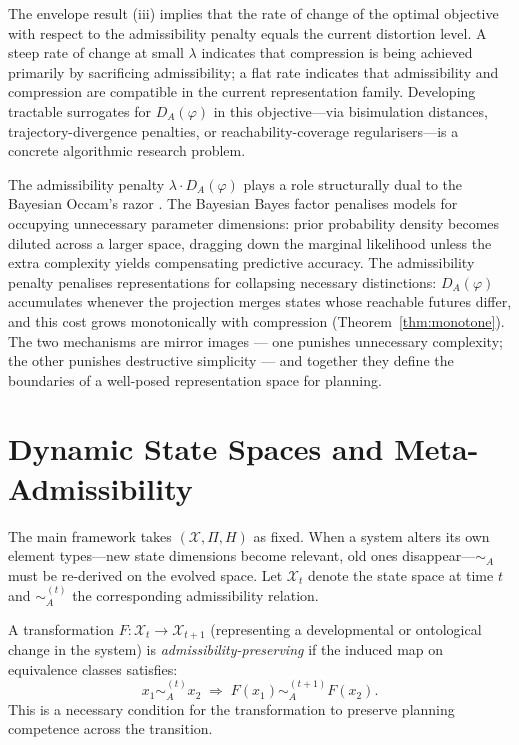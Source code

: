 \documentclass[10pt,twocolumn]{article}
\theoremstyle{plain}
\theoremstyle{definition}
\theoremstyle{remark}
\newcommand{\simA}{\sim_{\!A}}
\newcommand{\DA}{D_{A}(\varphi)}
\newcommand{\calX}{\mathcal{X}}
\begin{document}
The envelope result (iii) implies that the rate of change of the optimal
objective with respect to the admissibility penalty equals the current distortion
level. A steep rate of change at small $\lambda$ indicates that compression is
being achieved primarily by sacrificing admissibility; a flat rate indicates that
admissibility and compression are compatible in the current representation family.
Developing tractable surrogates for $\DA$ in this objective---via bisimulation
distances, trajectory-divergence penalties, or reachability-coverage
regularisers---is a concrete algorithmic research problem.

The admissibility penalty $\lambda\cdot\DA$ plays a role structurally dual to
the Bayesian Occam's razor \citep{jaynes2003probability}. The Bayesian Bayes
factor penalises models for occupying unnecessary parameter dimensions: prior
probability density becomes diluted across a larger space, dragging down the
marginal likelihood unless the extra complexity yields compensating predictive
accuracy. The admissibility penalty penalises representations for collapsing
necessary distinctions: $\DA$ accumulates whenever the projection merges states
whose reachable futures differ, and this cost grows monotonically with compression
(Theorem~\ref{thm:monotone}). The two mechanisms are mirror images --- one
punishes unnecessary complexity; the other punishes destructive simplicity --- and
together they define the boundaries of a well-posed representation space for
planning.

\section{Dynamic State Spaces and Meta-Admissibility}
\label{app:dynamic}

The main framework takes $(\calX,\Pi,H)$ as fixed. When a system alters its own
element types---new state dimensions become relevant, old ones disappear---$\simA$
must be re-derived on the evolved space. Let $\calX_t$ denote the state space
at time $t$ and $\sim_A^{(t)}$ the corresponding admissibility relation.

A transformation $F:\calX_t\to\calX_{t+1}$ (representing a developmental or
ontological change in the system) is \emph{admissibility-preserving} if the
induced map on equivalence classes satisfies:
\[
  x_1\sim_A^{(t)} x_2
  \;\Rightarrow\;
  F(x_1)\sim_A^{(t+1)} F(x_2).
\]
This is a necessary condition for the transformation to preserve planning
competence across the transition.
\end{document}
